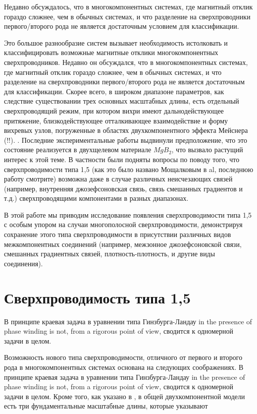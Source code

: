 Недавно обсуждалось, что в многокомпонентных системах, где магнитный отклик 
гораздо сложнее, чем в обычных системах, и что разделение на сверхпроводники 
первого/второго рода не является достаточным условием для классификации.

Это большое разнообразие систем вызывает необходимость истолковать и 
классифицировать возможные магнитные отклики многокомпонентных 
сверхпроводников. Недавно он обсуждался, что в многокомпонентных системах, 
где магнитный отклик гораздо сложнее, чем в обычных системах, и что разделение 
на сверхпроводники первого/второго рода не является достаточным для 
классификации. Скорее всего, в широком диапазоне параметров, как следствие 
существовании трех основных масштабных длины, есть отдельный сверхпроводящий 
режим, при котором вихри имеют дальнодействующее притяжение, близкодействующее 
отталкивающее взаимодействие и форму вихревых узлов, погруженные в областях 
двухкомпонентного эффекта Мейснера (!!). \cite{bib:1,bib:2}. Последние 
экспериментальные работы \cite{bib:16,bib:17} выдвинули предположение, что 
это состояние реализуется в двухщелевом материале \( MgB_2 \), что вызвало 
растущий интерес к этой теме. В частности были подняты вопросы по поводу того, 
что сверхпроводимости типа 1,5 (как это было названо Мощалковым в 
al\cite{bib:16}, последнюю работу смотрите\cite{bib:18}) возможна даже в 
случае различных неисчезающих связей (например, внутренняя джозефсоновская 
связь, связь смешанных градиентов и т.д.) сверхпроводящими компонентами в 
разных диапазонах.

В этой работе мы приводим исследование появления сверхпроводимости типа 1,5 с 
особым упором на случаи многополосной сверхпроводимости, демонстрируя 
сохранение этого типа сверхпроводимости в присутствии различных видов 
межкомпонентных соединений (например, межзонное джозефсоновской связи, 
смешанных градиентных связей, плотность-плотность, и другие виды соединения).

\section{Сверхпроводимость типа 1,5}
\label{sec:1-1}

В принципе краевая задача в уравнении типа Гинзбурга-Ландау in the presence of 
phase winding is not, from a rigorous point of view, сводится к одномерной 
задачи в целом.

Возможность нового типа сверхпроводимости, отличного от первого и второго рода 
в многокомпонентных системах \cite{bib:1,bib:2} основана на следующих 
соображениях. В принципе краевая задача в уравнении типа Гинзбурга-Ландау in 
the presence of phase winding is not, from a rigorous point of view, сводится 
к одномерной задачи в целом. Кроме того, как указано в \cite{bib:1,bib:2}, в 
общей двухкомпонентной модели есть три фундаментальные масштабные длины, 
которые указывают

